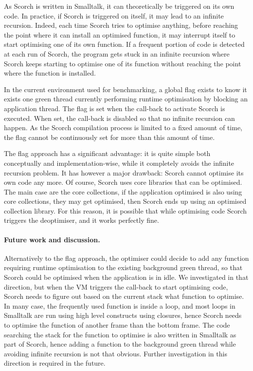 \documentclass[a4paper,12pt,twoside]{../includes/ThesisStyle}
\begin{document}
As Scorch is written in Smalltalk, it can theoretically be triggered on its own code. In practice, if Scorch is triggered on itself, it may lead to an infinite recursion. Indeed, each time Scorch tries to optimise anything, before reaching the point where it can install an optimised function, it may interrupt itself to start optimising one of its own function. If a frequent portion of code is detected at each run of Scorch, the program gets stuck in an infinite recursion where Scorch keeps starting to optimise one of its function without reaching the point where the function is installed.

In the current environment used for benchmarking, a global flag exists to know it exists one green thread currently performing runtime optimisation by blocking an application thread. The flag is set when the call-back to activate Scorch is executed. When set, the call-back is disabled so that no infinite recursion can happen. As the Scorch compilation process is limited to a fixed amount of time, the flag cannot be continuously set for more than this amount of time.

The flag approach has a significant advantage: it is quite simple both conceptually and implementation-wise, while it completely avoids the infinite recursion problem. It has however a major drawback: Scorch cannot optimise its own code any more. Of course, Scorch uses core libraries that can be optimised. The main case are the core collections, if the application optimised is also using core collections, they may get optimised, then Scorch ends up using an optimised collection library. For this reason, it is possible that while optimising code Scorch triggers the deoptimiser, and it works perfectly fine.

\paragraph{Future work and discussion.} Alternatively to the flag approach, the optimiser could decide to add any function requiring runtime optimisation to the existing background green thread, so that Scorch could be optimised when the application is in idle. We investigated in that direction, but when the VM triggers the call-back to start optimising code, Scorch needs to figure out based on the current stack what function to optimise. In many case, the frequently used function is inside a loop, and most loops in Smalltalk are run using high level constructs using closures, hence Scorch needs to optimise the function of another frame than the bottom frame. The code searching the stack for the function to optimise is also written in Smalltalk as part of Scorch, hence adding a function to the background green thread while avoiding infinite recursion is not that obvious. Further investigation in this direction is required in the future.
\end{document}
